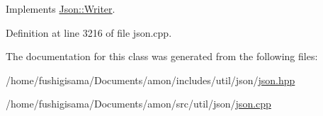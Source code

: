 Implements \hyperlink{class_json_1_1_writer_a7b2273a4ffd6f32b369ac8a53b7b5a0d}{Json\-::\-Writer}.



Definition at line 3216 of file json.\-cpp.



The documentation for this class was generated from the following files\-:\begin{DoxyCompactItemize}
\item 
/home/fushigisama/\-Documents/amon/includes/util/json/\hyperlink{json_8hpp}{json.\-hpp}\item 
/home/fushigisama/\-Documents/amon/src/util/json/\hyperlink{json_8cpp}{json.\-cpp}\end{DoxyCompactItemize}
